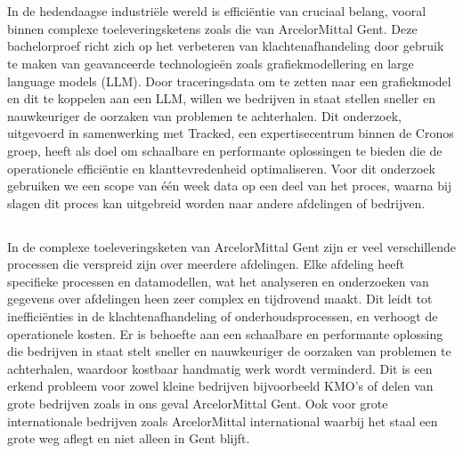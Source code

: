 
\chapter{}%
\label{ch:inleiding}

In de hedendaagse industriële wereld is efficiëntie van cruciaal belang, vooral binnen complexe toeleveringsketens zoals die van ArcelorMittal Gent. 
Deze bachelorproef richt zich op het verbeteren van klachtenafhandeling door gebruik te maken van geavanceerde technologieën zoals grafiekmodellering en large language models (LLM). 
Door traceringsdata om te zetten naar een grafiekmodel en dit te koppelen aan een LLM, willen we bedrijven in staat stellen sneller en nauwkeuriger de oorzaken van problemen te achterhalen. 
Dit onderzoek, uitgevoerd in samenwerking met Tracked, een expertisecentrum binnen de Cronos groep, heeft als doel om schaalbare en performante oplossingen te bieden die de operationele efficiëntie en klanttevredenheid optimaliseren.
Voor dit onderzoek gebruiken we een scope van één week data op een deel van het proces, waarna bij slagen dit proces kan uitgebreid worden naar andere afdelingen of bedrijven.

\section{}%
\label{sec:probleemstelling}

In de complexe toeleveringsketen van ArcelorMittal Gent zijn er veel verschillende processen die verspreid zijn over meerdere afdelingen. 
Elke afdeling heeft specifieke processen en datamodellen, wat het analyseren en onderzoeken van gegevens over afdelingen heen zeer complex en tijdrovend maakt. 
Dit leidt tot inefficiënties in de klachtenafhandeling of onderhoudsprocessen, en verhoogt de operationele kosten. 
Er is behoefte aan een schaalbare en performante oplossing die bedrijven in staat stelt sneller en nauwkeuriger de oorzaken van problemen te achterhalen, waardoor kostbaar handmatig werk wordt verminderd.
Dit is een erkend probleem voor zowel kleine bedrijven bijvoorbeeld KMO's of delen van grote bedrijven zoals in ons geval ArcelorMittal Gent. Ook voor grote internationale bedrijven zoals ArcelorMittal international waarbij het staal een grote weg aflegt en niet alleen in Gent blijft.

